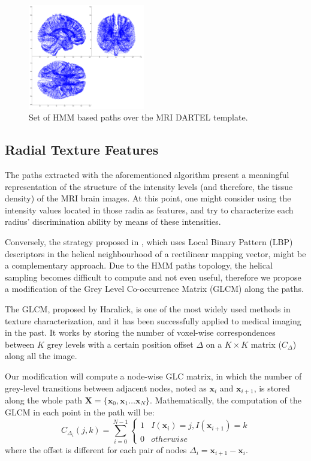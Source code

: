 \begin{figure}
	\begin{center}
		\includegraphics[width=2in]{Graphics/ch6/cuts}
		\caption[Set of \acs{HMM} based paths over the MRI DARTEL template.]{Set of \ac{HMM} based paths over the MRI DARTEL template.}
		\label{fig:cuts}
	\end{center}
\end{figure}


\subsection{Radial Texture Features}\label{sec:rtextfeat}
The paths extracted with the aforementioned algorithm present a meaningful representation of the structure of the intensity levels (and therefore, the tissue density) of the MRI brain images. At this point, one might consider using the intensity values located in those radia as features, and try to characterize each radius' discrimination ability by means of these intensities. 

Conversely, the strategy proposed in \cite{Martinez-MurciaVRLBP}, which uses Local Binary Pattern (LBP) descriptors in the helical neighbourhood of a rectilinear mapping vector, might be a complementary approach. Due to the \ac{HMM} paths topology, the helical sampling becomes difficult to compute and not even useful, therefore we propose a modification of the Grey Level Co-occurrence Matrix (GLCM) along the paths. 

The GLCM, proposed by Haralick\cite{Haralick73}, is one of the most widely used methods in texture characterization, and it has been successfully applied to medical imaging in the past\cite{kovalev2001three,martinez2014parametrization}. It works by storing the number of voxel-wise correspondences between $K$ grey levels with a certain position offset $\Delta$ on a  $K\times K$ matrix ($C_{\Delta}$) along all the image. 

Our modification will compute a node-wise GLC matrix, in which the number of grey-level transitions between adjacent nodes, noted as $\mathbf{x}_i$ and $\mathbf{x}_{i+1}$, is stored along the whole path $\mathbf{X} = \{\mathbf{x}_0, \mathbf{x}_1 \dots \mathbf{x}_N\}$. Mathematically, the computation of the GLCM in each point in the path will be: 
\begin{equation}\label{eq:glcm}
C_{\Delta_i}(j,k) = \sum_{i=0}^{N-1}
\begin{cases}
1 & I(\mathbf{x}_i) = j, I(\mathbf{x}_{i+1})=k\\
0 & otherwise
\end{cases}
\end{equation}
where the offset is different for each pair of nodes $\Delta_i=\mathbf{x}_{i+1}-\mathbf{x}_i$. 

